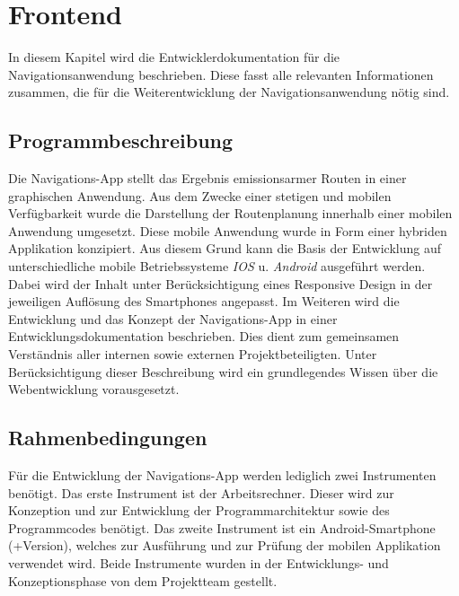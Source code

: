 \section{Frontend}
In diesem Kapitel wird die Entwicklerdokumentation für die Navigationsanwendung beschrieben. Diese fasst alle relevanten Informationen zusammen, die für die Weiterentwicklung der Navigationsanwendung nötig sind. 

\subsection{Programmbeschreibung}
Die Navigations-App stellt das Ergebnis emissionsarmer Routen in einer graphischen Anwendung. 
Aus dem Zwecke einer stetigen und mobilen Verfügbarkeit wurde die Darstellung der Routenplanung innerhalb einer mobilen Anwendung umgesetzt. 
Diese mobile Anwendung wurde in Form einer hybriden Applikation konzipiert. 
Aus diesem Grund kann die Basis der Entwicklung auf unterschiedliche mobile Betriebssysteme \textit{IOS} u. \textit{Android} ausgeführt werden. 
Dabei wird der Inhalt unter Berücksichtigung eines Responsive Design in der jeweiligen Auflösung des Smartphones angepasst. 
Im Weiteren wird die Entwicklung und das Konzept der Navigations-App in einer Entwicklungsdokumentation beschrieben. 
Dies dient zum gemeinsamen Verständnis aller internen sowie externen Projektbeteiligten. 
Unter Berücksichtigung dieser Beschreibung wird ein grundlegendes Wissen über die Webentwicklung vorausgesetzt.

\subsection{Rahmenbedingungen}
Für die Entwicklung der Navigations-App werden lediglich zwei Instrumenten benötigt. 
Das erste Instrument ist der Arbeitsrechner. Dieser wird zur Konzeption und zur Entwicklung der Programmarchitektur sowie des Programmcodes benötigt. 
Das zweite Instrument ist ein Android-Smartphone (+Version), welches zur Ausführung und zur Prüfung der mobilen Applikation verwendet wird. 
Beide Instrumente wurden in der Entwicklungs- und Konzeptionsphase von dem Projektteam gestellt.


